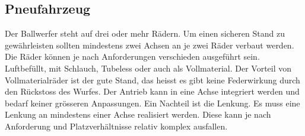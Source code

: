 \subsection{Pneufahrzeug}
Der Ballwerfer steht auf drei oder mehr Rädern. Um einen sicheren Stand zu gewährleisten sollten mindestens zwei Achsen an je zwei Räder verbaut werden. Die Räder können je nach Anforderungen verschieden ausgeführt sein. Luftbefüllt, mit Schlauch, Tubeless oder auch als Vollmaterial. Der Vorteil von Vollmaterialräder ist der gute Stand, das heisst es gibt keine Federwirkung durch den Rückstoss des Wurfes. Der Antrieb kann in eine Achse integriert werden und bedarf keiner grösseren Anpassungen. Ein Nachteil ist die Lenkung. Es muss eine Lenkung an mindestens einer Achse realisiert werden. Diese kann je nach Anforderung und Platzverhältnisse relativ komplex ausfallen.
 
